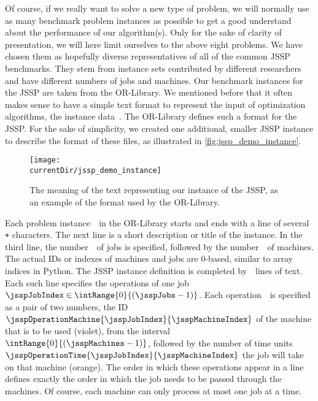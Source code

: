 Of course, if we really want to solve a new type of problem, we will normally use as many benchmark problem instances as possible to get a good understand about the performance of our algorithm(s).
Only for the sake of clarity of presentation, we will here limit ourselves to the above eight problems.
We have chosen them as hopefully diverse representatives of all of the common \gls{JSSP} benchmarks.
They stem from instance sets contributed by different researchers and have different numbers of jobs and machines.%
%
\endhsection%
%
%
\label{sec:jsspDemoInstance}%
Our benchmark instances for the \gls{JSSP} are taken from the OR\nobreakdash-Library.
We mentioned before that it often makes sense to have a simple text format to represent the input of optimization algorithms, the instance data~\instance.
The OR\nobreakdash-Library defines such a format for the \gls{JSSP}.
For the sake of simplicity, we created one additional, smaller \gls{JSSP} instance to describe the format of these files, as illustrated in \autoref{fig:jssp_demo_instance}.

\begin{figure}%
\centering%
\texttt{[image: \\currentDir/jssp\_demo\_instance]}%
\caption{The meaning of the text representing our  instance of the \gls{JSSP}, as an example of the format used by the OR-Library.}%
\label{fig:jssp_demo_instance}%
\end{figure}

Each problem instance~\instance\ in the OR\nobreakdash-Library starts and ends with a line of several \texttt{+} characters.
The next line is a short description or title of the instance.
In the third line, the number~\jsspJobs\ of jobs is specified, followed by the number~\jsspMachines\ of machines.
The actual IDs or indexes of machines and jobs are 0\nobreakdash-based, similar to array indices in Python.
The \gls{JSSP} instance definition is completed by~\jsspJobs\ lines of text.
Each such line specifies the operations of one job~$\jsspJobIndex\in\intRange{0}{(\jsspJobs-1)}$.
Each operation~\jsspMachineIndex\ is specified as a pair of two numbers, the ID~$\jsspOperationMachine{\jsspJobIndex}{\jsspMachineIndex}$ of the machine that is to be used ({\color{jssp-machine}violet}), from the interval~$\intRange{0}{(\jsspMachines-1)}$, followed by the number of time units~$\jsspOperationTime{\jsspJobIndex}{\jsspMachineIndex}$ the job will take on that machine ({\color{jssp-time}orange}).
The order in which these operations appear in a line defines exactly the order in which the job needs to be passed through the machines.
Of course, each machine can only process at most one job at a time.

